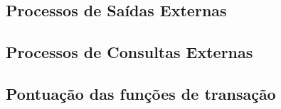     
  
  \subsection{Processos de Saídas Externas}
    
    

  \subsection{Processos de Consultas Externas}
    
    
    
    
\vfill
\pagebreak
  \subsection{Pontuação das funções de transação}
    
